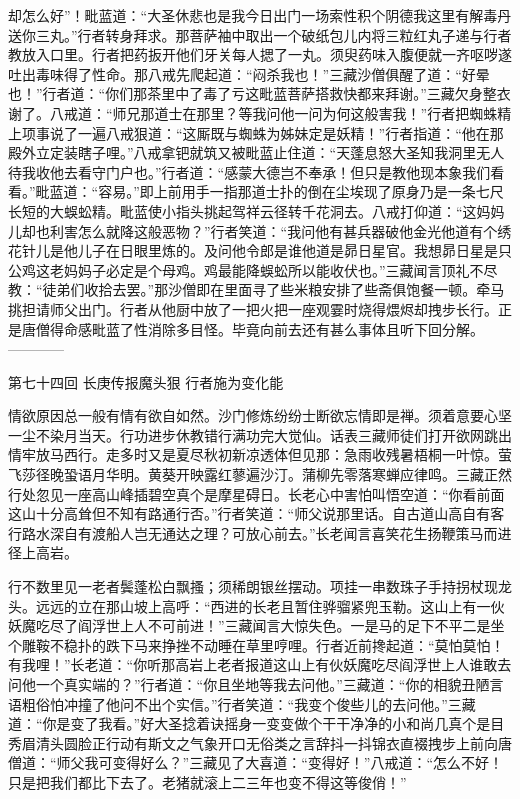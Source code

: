 \documentclass[12pt,UTF8]{ctexbook}
\begin{document}
却怎么好”！毗蓝道：“大圣休悲也是我今日出门一场索性积个阴德我这里有解毒丹送你三丸。”行者转身拜求。那菩萨袖中取出一个破纸包儿内将三粒红丸子递与行者教放入口里。行者把药扳开他们牙关每人揌了一丸。须臾药味入腹便就一齐呕哕遂吐出毒味得了性命。那八戒先爬起道：“闷杀我也！”三藏沙僧俱醒了道：“好晕也！”行者道：“你们那茶里中了毒了亏这毗蓝菩萨搭救快都来拜谢。”三藏欠身整衣谢了。八戒道：“师兄那道士在那里？等我问他一问为何这般害我！”行者把蜘蛛精上项事说了一遍八戒狠道：“这厮既与蜘蛛为姊妹定是妖精！”行者指道：“他在那殿外立定装瞎子哩。”八戒拿钯就筑又被毗蓝止住道：“天蓬息怒大圣知我洞里无人待我收他去看守门户也。”行者道：“感蒙大德岂不奉承！但只是教他现本象我们看看。”毗蓝道：“容易。”即上前用手一指那道士扑的倒在尘埃现了原身乃是一条七尺长短的大蜈蚣精。毗蓝使小指头挑起驾祥云径转千花洞去。八戒打仰道：“这妈妈儿却也利害怎么就降这般恶物？”行者笑道：“我问他有甚兵器破他金光他道有个绣花针儿是他儿子在日眼里炼的。及问他令郎是谁他道是昴日星官。我想昴日星是只公鸡这老妈妈子必定是个母鸡。鸡最能降蜈蚣所以能收伏也。”三藏闻言顶礼不尽教：“徒弟们收拾去罢。”那沙僧即在里面寻了些米粮安排了些斋俱饱餐一顿。牵马挑担请师父出门。行者从他厨中放了一把火把一座观霎时烧得煨烬却拽步长行。正是唐僧得命感毗蓝了性消除多目怪。毕竟向前去还有甚么事体且听下回分解。
------------

第七十四回 长庚传报魔头狠 行者施为变化能

情欲原因总一般有情有欲自如然。沙门修炼纷纷士断欲忘情即是禅。须着意要心坚一尘不染月当天。行功进步休教错行满功完大觉仙。话表三藏师徒们打开欲网跳出情牢放马西行。走多时又是夏尽秋初新凉透体但见那：急雨收残暑梧桐一叶惊。萤飞莎径晚蛩语月华明。黄葵开映露红蓼遍沙汀。蒲柳先零落寒蝉应律鸣。三藏正然行处忽见一座高山峰插碧空真个是摩星碍日。长老心中害怕叫悟空道：“你看前面这山十分高耸但不知有路通行否。”行者笑道：“师父说那里话。自古道山高自有客行路水深自有渡船人岂无通达之理？可放心前去。”长老闻言喜笑花生扬鞭策马而进径上高岩。

行不数里见一老者鬓蓬松白飘搔；须稀朗银丝摆动。项挂一串数珠子手持拐杖现龙头。远远的立在那山坡上高呼：“西进的长老且暂住骅骝紧兜玉勒。这山上有一伙妖魔吃尽了阎浮世上人不可前进！”三藏闻言大惊失色。一是马的足下不平二是坐个雕鞍不稳扑的跌下马来挣挫不动睡在草里哼哩。行者近前搀起道：“莫怕莫怕！有我哩！”长老道：“你听那高岩上老者报道这山上有伙妖魔吃尽阎浮世上人谁敢去问他一个真实端的？”行者道：“你且坐地等我去问他。”三藏道：“你的相貌丑陋言语粗俗怕冲撞了他问不出个实信。”行者笑道：“我变个俊些儿的去问他。”三藏道：“你是变了我看。”好大圣捻着诀摇身一变变做个干干净净的小和尚几真个是目秀眉清头圆脸正行动有斯文之气象开口无俗类之言辞抖一抖锦衣直裰拽步上前向唐僧道：“师父我可变得好么？”三藏见了大喜道：“变得好！”八戒道：“怎么不好！只是把我们都比下去了。老猪就滚上二三年也变不得这等俊俏！”
\end{document}
